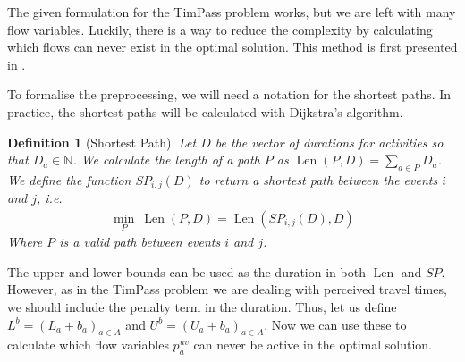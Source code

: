 \documentclass[english, 12pt, a4paper, sci, utf8, a-2b, online]{aaltothesis}
\newtheorem{definition}{Definition}
\newcommand{\N}{\mathbb{N}}
\newcommand{\shortestpath}{\mathit{SP}}
\newcommand{\len}{\operatorname{Len}}
\begin{document}

The given formulation for the TimPass problem works, but we are left with many flow variables. Luckily, there is a way to reduce the complexity by calculating which flows can never exist in the optimal solution. This method is first presented in \cite{schiewe2020periodic}. 


To formalise the preprocessing, we will need a notation for the shortest paths. In practice, the shortest paths will be calculated with Dijkstra's algorithm.
\begin{definition}[Shortest Path]
    Let $D$ be the vector of durations for activities so that $D_a \in \N$. We calculate the length of a path $P$ as $\len(P, D) = \sum_{a \in P} D_a$. We define the function $\shortestpath_{i,j}(D)$ to return a shortest path between the events $i$ and $j$, i.e. \begin{align}
        \min_P\  \len(P, D) = \len(\shortestpath_{i, j}(D), D)
    \end{align}
    Where $P$ is a valid path between events $i$ and $j$.
\end{definition}


The upper and lower bounds can be used as the duration in both $\len$ and $\shortestpath$. However, as in the TimPass problem we are dealing with perceived travel times, we should include the penalty term in the duration. Thus, let us define $L^b = (L_a + b_a)_{a\in A}$ and $U^b = (U_a + b_a)_{a \in A}$. Now we can use these to calculate which flow variables $p_a^{uv}$ can never be active in the optimal solution.
\end{document}
